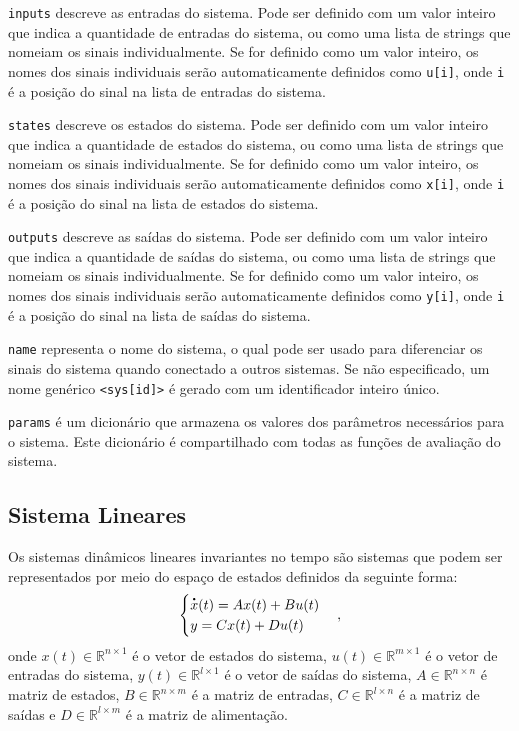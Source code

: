 \texttt{inputs} descreve as entradas do sistema. Pode ser definido com um valor inteiro que indica a quantidade de entradas do sistema, ou como uma lista de strings que nomeiam os sinais individualmente. Se for definido como um valor inteiro, os nomes dos sinais individuais serão automaticamente definidos como \texttt{u[i]}, onde \texttt{i} é a posição do sinal na lista de entradas do sistema.

\texttt{states} descreve os estados do sistema. Pode ser definido com um valor inteiro que indica a quantidade de estados do sistema, ou como uma lista de strings que nomeiam os sinais individualmente. Se for definido como um valor inteiro, os nomes dos sinais individuais serão automaticamente definidos como \texttt{x[i]}, onde \texttt{i} é a posição do sinal na lista de estados do sistema.

\texttt{outputs} descreve as saídas do sistema. Pode ser definido com um valor inteiro que indica a quantidade de saídas do sistema, ou como uma lista de strings que nomeiam os sinais individualmente. Se for definido como um valor inteiro, os nomes dos sinais individuais serão automaticamente definidos como \texttt{y[i]}, onde \texttt{i} é a posição do sinal na lista de saídas do sistema.

\texttt{name} representa o nome do sistema, o qual pode ser usado para diferenciar os sinais do sistema quando conectado a outros sistemas. Se não especificado, um nome genérico \texttt{<sys[id]>} é gerado com um identificador inteiro único.

\texttt{params} é um dicionário que armazena os valores dos parâmetros necessários para o sistema. Este dicionário é compartilhado com todas as funções de avaliação do sistema.

\subsection{Sistema Lineares}

Os sistemas dinâmicos lineares invariantes no tempo são sistemas que podem ser representados por meio do espaço de estados definidos da seguinte forma: \begin{equation}
  \begin{cases}
    \dt{x}(t) = Ax(t) + Bu(t) \\
    y = Cx(t) + Du(t)
  \end{cases},
  \label{eq:sim_space_model}
\end{equation} onde $x(t) \in \mathbb{R}^{n \times 1}$ é o vetor de estados do sistema, $u(t) \in \mathbb{R}^{m \times 1}$ é o vetor de entradas do sistema, $y(t) \in \mathbb{R}^{l \times 1}$ é o vetor de saídas do sistema, $A \in \mathbb{R}^{n \times n}$ é matriz de estados, $B \in \mathbb{R}^{n \times m}$ é a matriz de entradas, $C \in \mathbb{R}^{l \times n}$ é a matriz de saídas e $D \in \mathbb{R}^{l \times m}$ é a matriz de alimentação.

